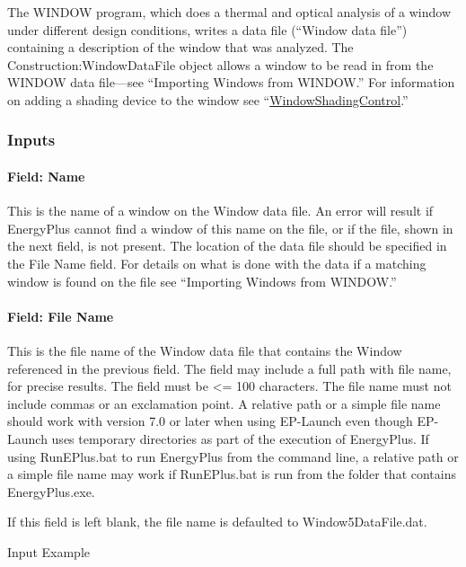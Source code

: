 The WINDOW program, which does a thermal and optical analysis of a window under different design conditions, writes a data file (``Window data file'') containing a description of the window that was analyzed. The Construction:WindowDataFile object allows a window to be read in from the WINDOW data file---see ``Importing Windows from WINDOW.'' For information on adding a shading device to the window see ``\hyperref[windowpropertyshadingcontrol]{WindowShadingControl}.''

\subsubsection{Inputs}\label{inputs-42}

\paragraph{Field: Name}\label{field-name-36}

This is the name of a window on the Window data file. An error will result if EnergyPlus cannot find a window of this name on the file, or if the file, shown in the next field, is not present. The location of the data file should be specified in the File Name field. For details on what is done with the data if a matching window is found on the file see ``Importing Windows from WINDOW.''

\paragraph{Field: File Name}\label{field-file-name-000}

This is the file name of the Window data file that contains the Window referenced in the previous field. The field may include a full path with file name, for precise results. The field must be \textless{}= 100 characters. The file name must not include commas or an exclamation point. A relative path or a simple file name should work with version 7.0 or later when using EP-Launch even though EP-Launch uses temporary directories as part of the execution of EnergyPlus. If using RunEPlus.bat to run EnergyPlus from the command line, a relative path or a simple file name may work if RunEPlus.bat is run from the folder that contains EnergyPlus.exe.

If this field is left blank, the file name is defaulted to Window5DataFile.dat.

Input Example

